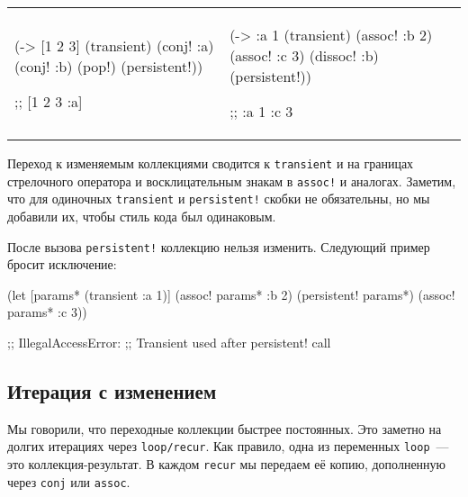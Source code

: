 \else

\begin{english}

\noindent
\begin{tabular}{ @{}p{5cm} @{}p{5cm} }

  \begin{clojure}
(-> [1 2 3]
    (transient)
    (conj! :a)
    (conj! :b)
    (pop!)
    (persistent!))

;; [1 2 3 :a]
  \end{clojure}

&

  \begin{clojure}
(-> {:a 1}
    (transient)
    (assoc! :b 2)
    (assoc! :c 3)
    (dissoc! :b)
    (persistent!))

;; {:a 1 :c 3}
  \end{clojure}

\end{tabular}

\end{english}

\fi

Переход к изменяемым коллекциями сводится к \verb|transient| и
 на границах стрелочного оператора и восклицательным знакам в
\verb|assoc!| и аналогах. Заметим, что для одиночных \verb|transient| и
\verb|persistent!| скобки не обязательны, но мы добавили их, чтобы стиль кода
был одинаковым.

После вызова \verb|persistent!| коллекцию нельзя изменить. Следующий пример
бросит исключение:

\begin{english}
  \begin{clojure}
(let [params* (transient {:a 1})]
  (assoc! params* :b 2)
  (persistent! params*)
  (assoc! params* :c 3))

;; IllegalAccessError:
;; Transient used after persistent! call
  \end{clojure}
\end{english}

\subsection{Итерация с изменением}


Мы говорили, что переходные коллекции быстрее постоянных. Это заметно на долгих
итерациях через \verb|loop/recur|. Как правило, одна из переменных
\verb|loop|~--- это коллекция-результат. В каждом \verb|recur| мы передаем её
копию, дополненную через \verb|conj| или \verb|assoc|.

